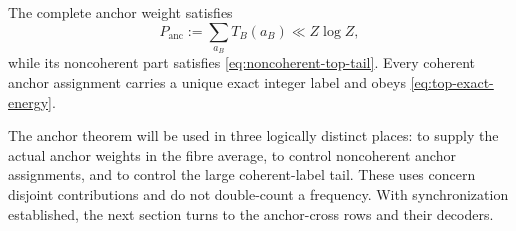 \begin{proposition}
\label{prop:top-partition}
The complete anchor weight satisfies
\begin{equation}
\label{eq:P-top}
 P_{\mathrm{anc}}:=\sum_{a_B}T_B(a_B)
 \ll Z\log Z,
\end{equation}
while its noncoherent part satisfies \cref{eq:noncoherent-top-tail}.  Every coherent anchor assignment carries a unique exact integer label and obeys \cref{eq:top-exact-energy}.
\end{proposition}

The anchor theorem will be used in three logically distinct places: to supply the actual anchor weights in the fibre average, to control noncoherent anchor assignments, and to control the large coherent-label tail.  These uses concern disjoint contributions and do not double-count a frequency.  With synchronization established, the next section turns to the anchor-cross rows and their decoders.
